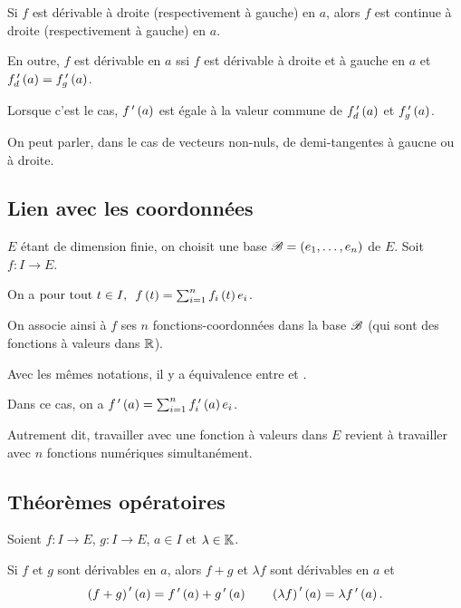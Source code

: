 \begin{prop}
Si \(f\) est dérivable à droite (respectivement à gauche) en \(a\), alors \(f\) est continue à droite (respectivement à gauche) en \(a\).

En outre, \(f\) est dérivable en \(a\) ssi \(f\) est dérivable à droite et à gauche en \(a\) et \(f_d^{\,\prime}\left(a\right)=f_g^{\,\prime}\left(a\right)\).

Lorsque c'est le cas, \(f^{\,\prime}\left(a\right)\) est égale à la valeur commune de \(f_d^{\,\prime}\left(a\right)\) et \(f_g^{\,\prime}\left(a\right)\).
\end{prop}

On peut parler, dans le cas de vecteurs non-nuls, de demi-tangentes à gaucne ou à droite.

\subsection{Lien avec les coordonnées}

\(E\) étant de dimension finie, on choisit une base \(\mathscr{B}=\left(e_1,\dots,e_n\right)\) de \(E\). Soit \(f:I\to E\).

On a \(\quantifs{\tpt t\in I}f\paren{t}=\sum_{i=1}^nf_i\paren{t}e_i\).

On associe ainsi à \(f\) ses \(n\) fonctions-coordonnées dans la base \(\mathscr{B}\) (qui sont des fonctions à valeurs dans \(\mathbb{R}\)).

\begin{prop}
Avec les mêmes notations, il y a équivalence entre  et .

Dans ce cas, on a \(f^{\,\prime}\left(a\right)=\sum_{i=1}^nf_i^{\,\prime}\left(a\right)e_i\).
\end{prop}

Autrement dit, travailler avec une fonction à valeurs dans \(E\) revient à travailler avec \(n\) fonctions numériques simultanément.

\subsection{Théorèmes opératoires}

\begin{prop}
Soient \(f:I\to E\), \(g:I\to E\), \(a\in I\) et \(\lambda\in\mathbb{K}\).

Si \(f\) et \(g\) sont dérivables en \(a\), alors \(f+g\) et \(\lambda f\) sont dérivables en \(a\) et \[\left(f+g\right)^{\,\prime}\left(a\right)=f^{\,\prime}\left(a\right)+g^{\,\prime}\left(a\right)\qquad\left(\lambda f\right)^{\,\prime}\left(a\right)=\lambda f^{\,\prime}\left(a\right).\]
\end{prop}

